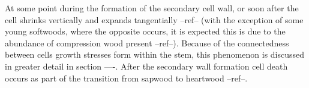 At some point during the formation of the secondary cell wall, or soon after the
cell shrinks vertically and expands tangentially --ref-- (with the exception of
some young softwoods, where the opposite occurs, it is expected this is due to
the abundance of compression wood present --ref--). Because of the connectedness
between cells growth stresses form within the stem, this phenomenon is discussed
in greater detail in section ----. After the secondary wall formation cell death
occurs as part of the transition from sapwood to heartwood --ref--.